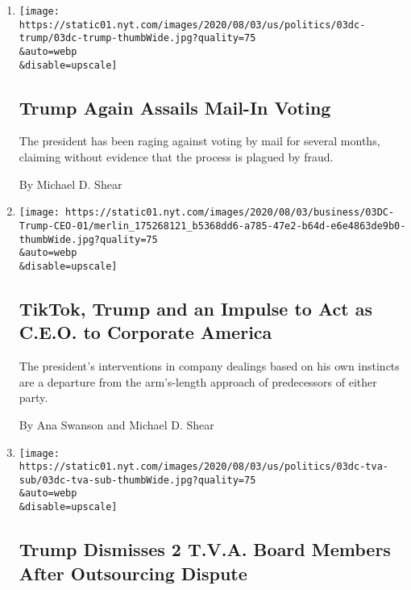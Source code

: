 \begin{enumerate}
\def\labelenumi{\arabic{enumi}.}
\item
  \href{/2020/08/03/us/politics/trump-mail-in-voting.html}{}

  \texttt{[image: https://static01.nyt.com/images/2020/08/03/us/politics/03dc-trump/03dc-trump-thumbWide.jpg?quality=75\\\&auto=webp\\\&disable=upscale]}

  \hypertarget{trump-again-assails-mail-in-voting}{%
  \subsection{Trump Again Assails Mail-In
  Voting}\label{trump-again-assails-mail-in-voting}}

  The president has been raging against voting by mail for several
  months, claiming without evidence that the process is plagued by
  fraud.

  By Michael D. Shear
\item
  \href{/2020/08/03/business/economy/trump-tiktok-china-business.html}{}

  \texttt{[image: https://static01.nyt.com/images/2020/08/03/business/03DC-Trump-CEO-01/merlin\_175268121\_b5368dd6-a785-47e2-b64d-e6e4863de9b0-thumbWide.jpg?quality=75\\\&auto=webp\\\&disable=upscale]}

  \hypertarget{tiktok-trump-and-an-impulse-to-act-as-ceo-to-corporate-america}{%
  \subsection{TikTok, Trump and an Impulse to Act as C.E.O. to Corporate
  America}\label{tiktok-trump-and-an-impulse-to-act-as-ceo-to-corporate-america}}

  The president's interventions in company dealings based on his own
  instincts are a departure from the arm's-length approach of
  predecessors of either party.

  By Ana Swanson and Michael D. Shear
\item
  \href{/2020/08/03/us/politics/trump-tennessee-valley-authority.html}{}

  \texttt{[image: https://static01.nyt.com/images/2020/08/03/us/politics/03dc-tva-sub/03dc-tva-sub-thumbWide.jpg?quality=75\\\&auto=webp\\\&disable=upscale]}

  \hypertarget{trump-dismisses-2-tva-board-members-after-outsourcing-dispute}{%
  \subsection{Trump Dismisses 2 T.V.A. Board Members After Outsourcing
  Dispute}\label{trump-dismisses-2-tva-board-members-after-outsourcing-dispute}}


\end{enumerate}
